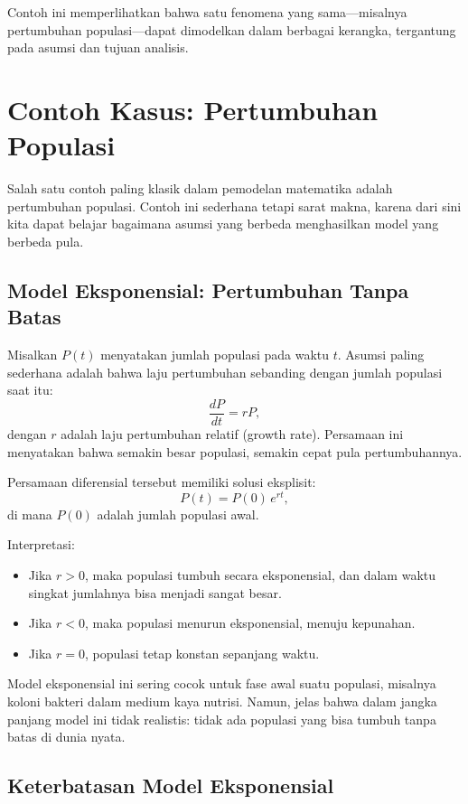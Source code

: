 \documentclass{bukumjh}
\begin{document}
Contoh ini memperlihatkan bahwa satu fenomena yang sama—misalnya pertumbuhan populasi—dapat dimodelkan dalam berbagai kerangka, tergantung pada asumsi dan tujuan analisis.

\section{Contoh Kasus: Pertumbuhan Populasi}

Salah satu contoh paling klasik dalam pemodelan matematika adalah pertumbuhan populasi. Contoh ini sederhana tetapi sarat makna, karena dari sini kita dapat belajar bagaimana asumsi yang berbeda menghasilkan model yang berbeda pula.

\subsection*{Model Eksponensial: Pertumbuhan Tanpa Batas}

Misalkan $P(t)$ menyatakan jumlah populasi pada waktu $t$. Asumsi paling sederhana adalah bahwa laju pertumbuhan sebanding dengan jumlah populasi saat itu:
\[
\frac{dP}{dt} = rP,
\]
dengan $r$ adalah laju pertumbuhan relatif (growth rate). Persamaan ini menyatakan bahwa semakin besar populasi, semakin cepat pula pertumbuhannya. 

Persamaan diferensial tersebut memiliki solusi eksplisit:
\[
P(t) = P(0)\, e^{rt},
\]
di mana $P(0)$ adalah jumlah populasi awal. 

{\jsg Interpretasi:}
\begin{itemize}
    \item Jika $r>0$, maka populasi tumbuh secara eksponensial, dan dalam waktu singkat jumlahnya bisa menjadi sangat besar.
    \item Jika $r<0$, maka populasi menurun eksponensial, menuju kepunahan.
    \item Jika $r=0$, populasi tetap konstan sepanjang waktu.
\end{itemize}

Model eksponensial ini sering cocok untuk fase awal suatu populasi, misalnya koloni bakteri dalam medium kaya nutrisi. Namun, jelas bahwa dalam jangka panjang model ini tidak realistis: tidak ada populasi yang bisa tumbuh tanpa batas di dunia nyata.

\subsection*{Keterbatasan Model Eksponensial}
\end{document}
